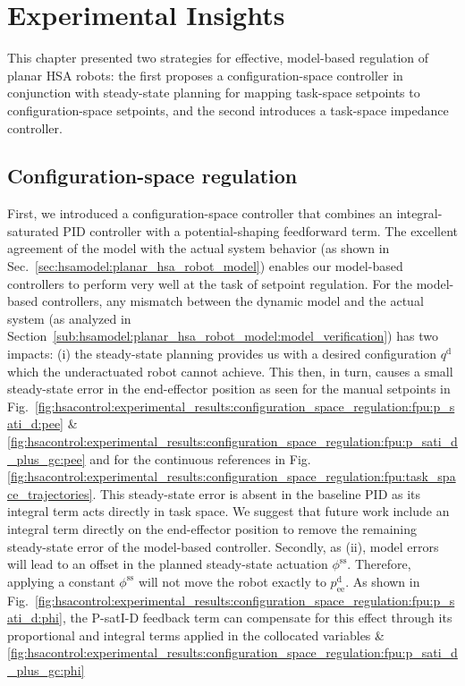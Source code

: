 \section{Experimental Insights}
This chapter presented two strategies for effective, model-based regulation of planar \gls{HSA} robots: the first proposes a configuration-space controller in conjunction with steady-state planning for mapping task-space setpoints to configuration-space setpoints, and the second introduces a task-space impedance controller.

\subsection{Configuration-space regulation}

First, we introduced a configuration-space controller that combines an integral-saturated PID controller with a potential-shaping feedforward term.
The excellent agreement of the model with the actual system behavior (as shown in Sec.~\ref{sec:hsamodel:planar_hsa_robot_model}) enables our model-based controllers to perform very well at the task of setpoint regulation.
For the model-based controllers, any mismatch between the dynamic model and the actual system (as analyzed in Section~\ref{sub:hsamodel:planar_hsa_robot_model:model_verification}) has two impacts: (i) the steady-state planning provides us with a desired configuration $q^\mathrm{d}$ which the underactuated robot cannot achieve. This then, in turn, causes a small steady-state error in the end-effector position as seen for the manual setpoints in Fig.~\ref{fig:hsacontrol:experimental_results:configuration_space_regulation:fpu:p_sati_d:pee} \& \ref{fig:hsacontrol:experimental_results:configuration_space_regulation:fpu:p_sati_d_plus_gc:pee} 
and for the continuous references in Fig.\ref{fig:hsacontrol:experimental_results:configuration_space_regulation:fpu:task_space_trajectories}. This steady-state error is absent in the baseline PID as its integral term acts directly in task space. We suggest that future work include an integral term directly on the end-effector position to remove the remaining steady-state error of the model-based controller. Secondly, as (ii), model errors will lead to an offset in the planned steady-state actuation $\phi^\mathrm{ss}$. Therefore, applying a constant $\phi^\mathrm{ss}$ will not move the robot exactly to $p_\mathrm{ee}^\mathrm{d}$. As shown in Fig.~\ref{fig:hsacontrol:experimental_results:configuration_space_regulation:fpu:p_sati_d:phi}, the P-satI-D feedback term can compensate for this effect through its proportional and integral terms applied in the collocated variables \& \ref{fig:hsacontrol:experimental_results:configuration_space_regulation:fpu:p_sati_d_plus_gc:phi} 
